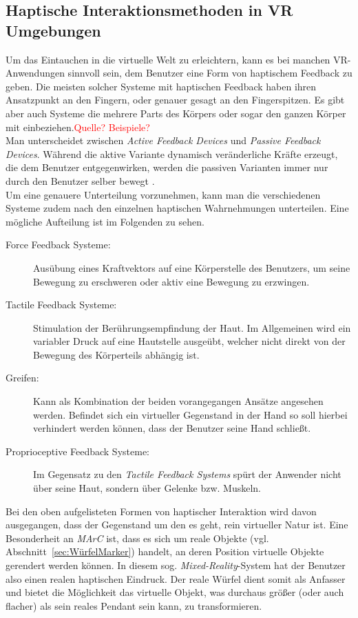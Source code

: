 \subsection{Haptische Interaktionsmethoden in VR Umgebungen}\label{sec:HaptikAnwendungen}
Um das Eintauchen in die virtuelle Welt zu erleichtern, kann es bei manchen VR-Anwendungen sinnvoll sein, dem Benutzer eine Form von haptischem Feedback zu geben. Die meisten solcher Systeme mit haptischen Feedback haben ihren Ansatzpunkt an den Fingern, oder genauer gesagt an den Fingerspitzen. Es gibt aber auch Systeme die mehrere Parts des Körpers oder sogar den ganzen Körper mit einbeziehen.\textcolor{red}{Quelle? Beispiele?}\\
Man unterscheidet zwischen \textit{Active Feedback Devices} und \textit{Passive Feedback Devices}. Während die aktive Variante dynamisch veränderliche Kräfte erzeugt, die dem Benutzer entgegenwirken, werden die passiven Varianten immer nur durch den Benutzer selber bewegt \cite{Haptic}.\\
Um eine genauere Unterteilung vorzunehmen, kann man die verschiedenen Systeme zudem nach den einzelnen haptischen Wahrnehmungen unterteilen. Eine mögliche Aufteilung ist im Folgenden zu sehen.

\begin{description}
	\item[Force Feedback Systeme:] Ausübung eines Kraftvektors auf eine Körperstelle des Benutzers, um seine Bewegung zu erschweren oder aktiv eine Bewegung zu erzwingen. %
	\item[Tactile Feedback Systeme:] Stimulation der Berührungsempfindung der Haut. Im Allgemeinen wird ein variabler Druck auf eine Hautstelle ausgeübt, welcher nicht direkt von der Bewegung des Körperteils abhängig ist.
	\item[Greifen:] Kann als Kombination der beiden vorangegangen Ansätze angesehen werden. Befindet sich ein virtueller Gegenstand in der Hand so soll hierbei verhindert werden können, dass der Benutzer seine Hand schließt. 
	\item[Proprioceptive Feedback Systeme:] Im Gegensatz zu den \textit{Tactile Feedback Systems} spürt der Anwender nicht über seine Haut, sondern über Gelenke bzw. Muskeln. 
\end{description}

Bei den oben aufgelisteten Formen von haptischer Interaktion wird davon ausgegangen, dass der Gegenstand um den es geht, rein virtueller Natur ist. Eine Besonderheit an \textit{MArC} ist, dass es sich um reale Objekte (vgl. Abschnitt~\ref{sec:WürfelMarker}) handelt, an deren Position virtuelle Objekte gerendert werden können. In diesem sog. \textit{Mixed-Reality}-System hat der Benutzer also einen realen haptischen Eindruck. Der reale Würfel dient somit als Anfasser und bietet die Möglichkeit das virtuelle Objekt, was durchaus größer (oder auch flacher) als sein reales Pendant sein kann, zu transformieren. 

